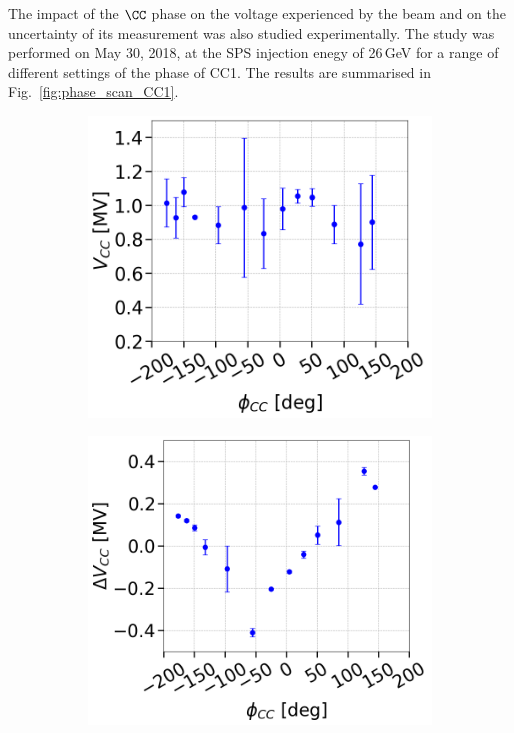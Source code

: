 The impact of the $\CC$ phase on the voltage experienced by the beam and on the uncertainty of its measurement was also studied experimentally. The study was performed on May 30, 2018, at the SPS injection enegy of 26\,GeV for a range of different settings of the phase of CC1. The results are summarised in Fig.~\ref{fig:phase_scan_CC1}.

\begin{figure}[!ht]
   \centering
   \begin{subfigure}[t]{0.45\textwidth}
       \centering
       \includegraphics[width=1\textwidth]{images/Ch4/Vcc_vs_phase.png}
   \end{subfigure}
   \hfill
   \begin{subfigure}[t]{0.45\textwidth}
       \centering
       \includegraphics[width=1\textwidth]{images/Ch4/DeltaVcc_vs_phase.png}

\end{subfigure}
\end{figure}
